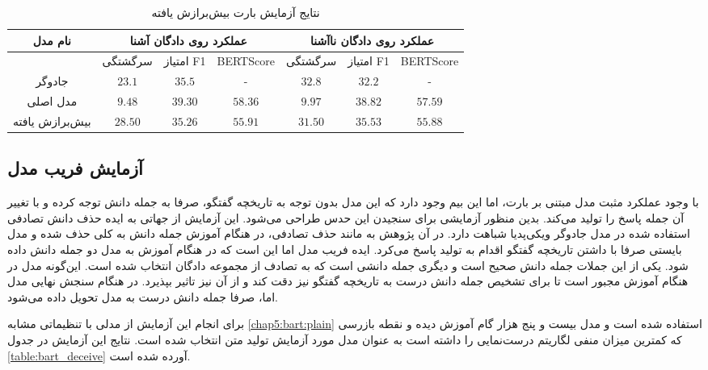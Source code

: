 \begin{table}[h]
	\caption{نتایج آزمایش بارت بیش‌برازش یافته}
	\label{table:bart_overfit}
	\begin{tabular}{|c|c|c|c|c|c|c|}
		\hline
		نام مدل         & \multicolumn{3}{c|}{عملکرد روی دادگان آشنا} & \multicolumn{3}{c|}{عملکرد روی دادگان نا‌آشنا} \\ \hline
		& سرگشتگی     & امتیاز F1     & BERTScore     & سرگشتگی      & امتیاز F1      & BERTScore      \\ \hline
		جادوگر          & $23.1$      & $35.5$        & -             & $32.8$       & $32.2$         & -              \\ \hline
		مدل اصلی        & $9.48$      & $39.30$       & $58.36$       & $9.97$       & $38.82$        & $57.59$        \\ \hline
		بیش‌برازش یافته & $28.50$     & $35.26$       & $55.91$       & $31.50$      & $35.53$        & $55.88$        \\ \hline
	\end{tabular}
\end{table}


\subsection{آزمایش فریب مدل}
با وجود عملکرد مثبت مدل مبتنی بر بارت، اما این بیم وجود دارد که این مدل بدون توجه به تاریخچه گفتگو، صرفا به جمله دانش توجه کرده و با تغییر آن جمله پاسخ را تولید می‌کند. بدین منظور آزمایشی برای سنجیدن این حدس طراحی می‌شود. این آزمایش از جهاتی به ایده حذف دانش تصادفی استفاده شده در مدل جادوگر ویکی‌پدیا شباهت دارد. در آن پژوهش به مانند حذف تصادفی، در هنگام آموزش جمله دانش به کلی حذف شده و مدل بایستی صرفا با داشتن تاریخچه گفتگو اقدام به تولید پاسخ می‌کرد. ایده فریب مدل اما این است که در هنگام آموزش به مدل دو جمله دانش داده شود. یکی از این جملات جمله دانش صحیح است و دیگری جمله دانشی است که به تصادف از مجموعه دادگان انتخاب شده است. این‌گونه مدل در هنگام آموزش مجبور است تا برای تشخیص جمله دانش درست به تاریخچه گفتگو نیز دقت کند و از آن نیز تاثیر بپذیرد. در هنگام سنجش نهایی مدل اما، صرفا جمله دانش درست به مدل تحویل داده می‌شود. 

برای انجام این آزمایش از مدلی با تنظیماتی مشابه 
\ref{chap5:bart:plain}
استفاده شده است و مدل بیست و پنج هزار گام آموزش دیده و نقطه بازرسی که کمترین میزان منفی لگاریتم درست‌نمایی را داشته است به عنوان مدل مورد آزمایش تولید متن انتخاب شده است. نتایج این آزمایش در جدول 
\ref{table:bart_deceive}
آورده شده است.

